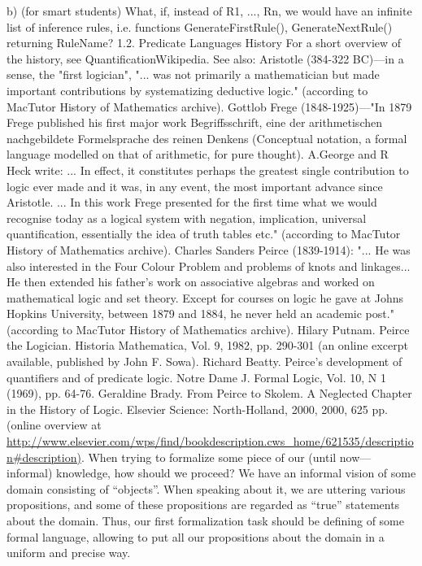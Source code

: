 b) (for smart students) What, if, instead of {R1, ..., Rn}, we would have an infinite list of inference rules,
i.e. functions GenerateFirstRule(), GenerateNextRule() returning RuleName?
1.2. Predicate Languages
History
For a short overview of the history, see QuantificationWikipedia.
See also:
Aristotle (384-322 BC)---in a sense, the "first logician", "... was not primarily a mathematician but made important
contributions by systematizing deductive logic." (according to MacTutor History of Mathematics archive).
Gottlob Frege (1848-1925)---"In 1879 Frege published his first major work Begriffsschrift, eine der arithmetischen
nachgebildete Formelsprache des reinen Denkens (Conceptual notation, a formal language modelled on that of arithmetic, for
pure thought). A.George and R Heck write: ... In effect, it constitutes perhaps the greatest single contribution to logic ever
made and it was, in any event, the most important advance since Aristotle. ... In this work Frege presented for the first time
what we would recognise today as a logical system with negation, implication, universal quantification, essentially the idea of
truth tables etc." (according to MacTutor History of Mathematics archive).
Charles Sanders Peirce (1839-1914): "... He was also interested in the Four Colour Problem and problems of knots and
linkages... He then extended his father's work on associative algebras and worked on mathematical logic and set theory. Except
for courses on logic he gave at Johns Hopkins University, between 1879 and 1884, he never held an academic post."
(according to MacTutor History of Mathematics archive).
Hilary Putnam. Peirce the Logician. Historia Mathematica, Vol. 9, 1982, pp. 290-301 (an online excerpt available, published
by John F. Sowa).
Richard Beatty. Peirce's development of quantifiers and of predicate logic. Notre Dame J. Formal Logic, Vol. 10, N 1 (1969),
pp. 64-76.
Geraldine Brady. From Peirce to Skolem. A Neglected Chapter in the History of Logic. Elsevier Science: North-Holland, 2000,
2000, 625 pp. (online overview at
\url{http://www.elsevier.com/wps/find/bookdescription.cws\_home/621535/description#description)}.
When trying to formalize some piece of our (until now---informal) knowledge, how should we proceed?
We have an informal vision of some domain consisting of ``objects''. When speaking about it, we are
uttering various propositions, and some of these propositions are regarded as ``true'' statements about the
domain.
Thus, our first formalization task should be defining of some formal language, allowing to put all our
propositions about the domain in a uniform and precise way.
